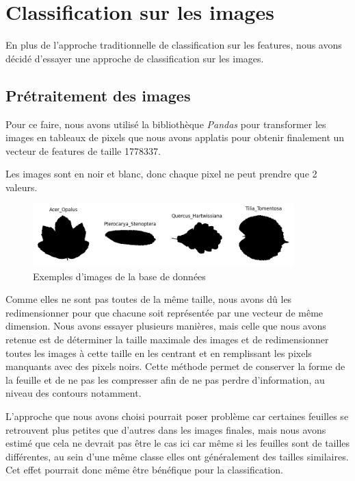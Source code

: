 \documentclass{article}
\begin{document}
\newpage
\section{Classification sur les images}
En plus de l'approche traditionnelle de classification sur les features, nous avons
décidé d'essayer une approche de classification sur les images. 

\subsection{Prétraitement des images}
Pour ce faire, nous avons
utilisé la bibliothèque \textit{Pandas} \cite{pandas} pour transformer les images en
tableaux de pixels que nous avons applatis pour obtenir finalement un vecteur de features de taille
1778337.

Les images sont en noir et blanc, donc chaque pixel ne peut prendre que 2 valeurs.

\begin{figure}[h]
    \centering
    \includegraphics[width=0.9\textwidth]{img/img_examples.png}
    \caption{Exemples d'images de la base de données}
\end{figure}

Comme elles ne sont pas toutes de la même taille, nous avons dû les redimensionner
pour que chacune soit représentée par une vecteur de même dimension. Nous avons
essayer plusieurs manières,
mais celle que nous avons retenue est de déterminer la taille maximale des images
et de redimensionner toutes les images à cette taille en les centrant et en remplissant
les pixels manquants avec des pixels noirs. Cette méthode permet de conserver
la forme de la feuille et de ne pas les compresser afin de ne pas perdre d'information,
au niveau des contours notamment.

L'approche que nous avons choisi pourrait poser problème car certaines feuilles se
retrouvent plus petites que d'autres dans les images finales, mais nous avons estimé
que cela ne devrait pas être le cas ici car même si les feuilles sont de tailles
différentes, au sein d'une même classe elles ont généralement des tailles similaires.
Cet effet pourrait donc même être bénéfique pour la classification.
\end{document}
